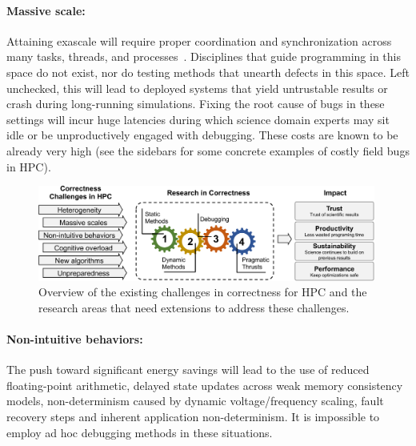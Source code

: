 \paragraph{Massive scale:}

  Attaining exascale will require proper coordination and synchronization
  across many tasks, threads, and processes~\cite{exascale-computing-project}.
  Disciplines that guide programming in this space do not exist, nor do testing methods that unearth defects in this space.
Left unchecked, this will lead to deployed systems that yield untrustable results or
crash during long-running simulations. 
Fixing the root cause of bugs in these
settings will incur huge latencies during which science
domain
experts may sit idle or be unproductively engaged with
debugging. These costs are known to be already very high (see the sidebars for some concrete examples of costly field bugs in HPC).


\begin{figure}
\centering
\begin{adjustbox}{width=1.15\textwidth,center}
\includegraphics[width=0.99\textwidth]{figures/overview_diagram.pdf}
\end{adjustbox}
\caption{Overview of the existing challenges in correctness for HPC and the research areas that need extensions to address these challenges.}
\label{fig:overview-challenges}
\end{figure}


\paragraph{Non-intuitive behaviors:}
 The push toward significant energy savings will lead to the use of
  reduced floating-point arithmetic, delayed state updates across weak
  memory consistency models, non-determinism caused by dynamic
  voltage/frequency scaling, fault recovery steps and inherent
  application non-determinism.  It is impossible to employ ad hoc
  debugging methods in these situations.


